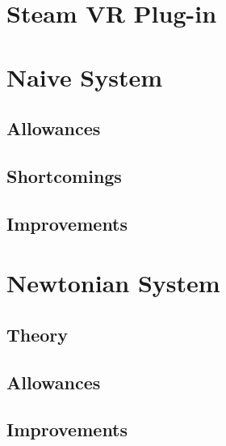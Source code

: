 \section{Steam VR Plug-in}\label{steamVR}


\section{Naive System}\label{old}


\subsection{Allowances}\label{old _ allowances}


\subsection{Shortcomings}\label{old _ shortcomings}


\subsection{Improvements}\label{old _ improvements}


\section{Newtonian System}\label{new}


\subsection{Theory}\label{new _ theory}


\subsection{Allowances}\label{new _ allowances}


\subsection{Improvements}\label{new _ improvements}


